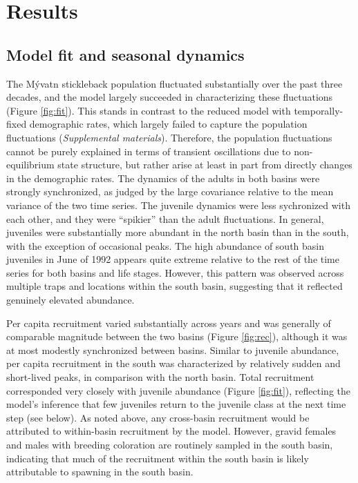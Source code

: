 \documentclass[11pt]{article}
\begin{document}
{\section*{Results}



\subsection*{Model fit and seasonal dynamics} 

The M\'{y}vatn stickleback population fluctuated substantially over the past
three decades, 
and the model largely succeeded in characterizing these fluctuations 
(Figure \ref{fig:fit}).
This stands in contrast to the reduced model with temporally-fixed demographic rates,
which largely failed to capture the population fluctuations (\emph{Supplemental materials}).
Therefore, the population fluctuations cannot be purely explained 
in terms of transient oscillations due to non-equilibrium state structure, 
but rather arise at least in part from directly changes in the demographic rates. 
The dynamics of the adults in both basins were strongly synchronized,
as judged by the large covariance relative to the mean variance of the two time series.
The juvenile dynamics were less sychronized with each other,
and they were ``spikier'' than the adult fluctuations.
In general, juveniles were substantially more abundant in the north basin than in the south,
with the exception of occasional peaks. 
The high abundance of south basin juveniles in June of 1992 appears quite extreme
relative to the rest of the time series for both basins and life stages.
However, this pattern was observed across multiple traps and locations within the south basin,
suggesting that it reflected genuinely elevated abundance.

Per capita recruitment varied substantially across years and was generally of comparable
magnitude between the two basins (Figure \ref{fig:rec}),
although it was at most modestly synchronized between basins.
Similar to juvenile abundance, per capita recruitment in the south 
was characterized by relatively sudden and short-lived peaks, 
in comparison with the north basin.
Total recruitment corresponded very closely with juvenile abundance (Figure \ref{fig:fit}),
reflecting the model's inference 
that few juveniles return to the juvenile class at the next time step (see below).
As noted above, 
any cross-basin recruitment would be attributed 
to within-basin recruitment by the model. 
However, gravid females and males with breeding coloration are routinely sampled in the 
south basin, indicating that much of the recruitment within the south basin is 
likely attributable to spawning in the south basin.

}
\end{document}
